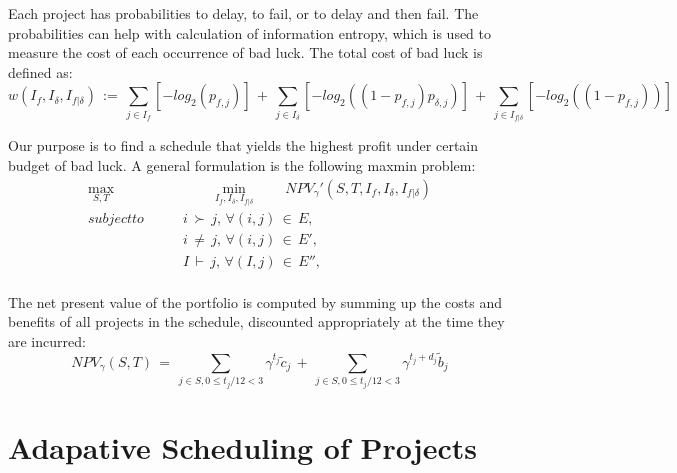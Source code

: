 \documentclass[final,3p,times]{elsarticle}
\begin{document}
Each project has probabilities to delay, to fail, or to delay and then fail. The probabilities can help with calculation of information entropy, which is used to measure the cost of each occurrence of bad luck. The total cost of bad luck is defined as:
\begin{equation*}
	w(I_f, I_{\delta}, I_{f|\delta})\,:=\,\sum_{j\in I_f} [-log_2(p_{f,j})]\,+\,\sum_{j\in I_{\delta}}[-log_2((1-p_{f,j})p_{\delta,j})]\,+\,\sum_{j\in I_{f|\delta}}[-log_2((1-p_{f,j}))]
\end{equation*}

Our purpose is to find a schedule that yields the highest profit under certain budget of bad luck. A general formulation is the following maxmin problem:
\begin{equation}\label{SecondOrProblem}
	\begin{aligned}
		\max_{S,T}&\qquad\min_{I_f, I_{\delta}, I_{f|\delta}}\qquad NPV_{\gamma}'(S,T,I_f, I_{\delta}, I_{f|\delta})\\
		subject to \qquad & i\,\succ\,j,\,\forall (i,j)\,\in\,E,\\
		& i \,\neq \,j, \,\forall (i,j)\,\in\,E',\\
		& I \,\vdash \,j, \,\forall (I,j)\,\in\,E'',\\
	\end{aligned}
\end{equation}

The net present value of the portfolio is computed by summing up the costs and benefits of all projects in the schedule, discounted appropriately at the time they are incurred:
\begin{equation}
	NPV_{\gamma}(S,T)\,=\,\sum_{j\in S, 0\leq t_j/12<3} \gamma^{t_j} \tilde{c}_j\,+\,\sum_{j\in S, 0\leq t_j/12<3} \gamma^{t_j+d_j} \tilde{b}_j
\end{equation}

\section{Adapative Scheduling of Projects}
\end{document}

